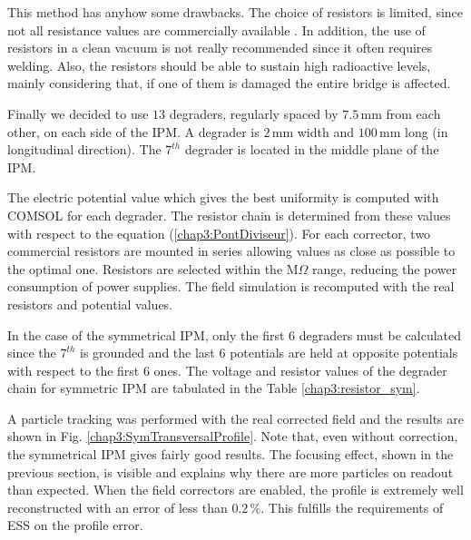 \begin{refsection}
  

  This method has anyhow some drawbacks. The choice of resistors is limited, since not all resistance values are commercially available \cite{Vishay2012}. In addition, the use of resistors in a clean vacuum is not really recommended since it often requires welding. Also, the resistors should be able to sustain high radioactive levels, mainly considering that, if one of them is damaged the entire bridge is affected.

  Finally we decided to use $13$ degraders, regularly spaced by $7.5\,\mathrm{mm}$ from each other, on each side of the IPM. A degrader is $2\,\mathrm{mm}$ width and $100\,\mathrm{mm}$ long (in longitudinal direction). The $7^{th}$ degrader is located in the middle plane of the IPM.

  The electric potential value which gives the best uniformity is computed with COMSOL for each degrader. The resistor chain is determined from these values with respect to the equation (\ref{chap3:PontDiviseur}). For each corrector, two commercial resistors are mounted in series allowing values as close as possible to the optimal one. Resistors are selected within the $\mathrm{M}\Omega $ range, reducing the power consumption of power supplies. The field simulation is recomputed with the real resistors and potential values.

  In the case of the symmetrical IPM, only the first $6$ degraders must be calculated since the $7^{th}$ is grounded and the last $6$ potentials are held at opposite potentials with respect to  the first 6 ones. The voltage and resistor values of the degrader chain for symmetric IPM are tabulated in the Table \ref{chap3:resistor_sym}.

  

  A particle tracking was performed with the real corrected field and the results are shown in Fig. \ref{chap3:SymTransversalProfile}. Note that, even without correction, the symmetrical IPM gives fairly good results. The focusing effect, shown in the previous section, is visible and explains why there are more particles on readout than expected. When the field correctors are enabled, the profile is extremely well reconstructed with an error of less than $0.2\,\mathrm{\%}$.  This fulfills the requirements of ESS on the profile error.

  


\end{refsection}
